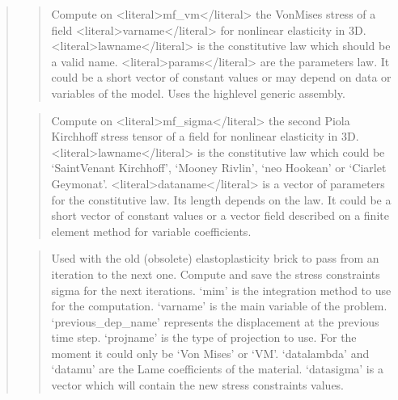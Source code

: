\documentclass[a4paper,11pt,english]{sphinxmanual}
\begin{document}
\begin{quote}
\sphinxAtStartPar
{}
\begin{quote}

\sphinxAtStartPar
Compute on \textless{}literal\textgreater{}mf\_vm\textless{}/literal\textgreater{} the Von\sphinxhyphen{}Mises stress of a field \textless{}literal\textgreater{}varname\textless{}/literal\textgreater{}
for nonlinear elasticity in 3D. \textless{}literal\textgreater{}lawname\textless{}/literal\textgreater{} is the constitutive law which
should be a valid name. \textless{}literal\textgreater{}params\textless{}/literal\textgreater{} are the parameters law. It could be
a short vector of constant values or may depend on data or variables
of the model.
Uses the high\sphinxhyphen{}level generic assembly.
\end{quote}

\sphinxAtStartPar
{}
\begin{quote}

\sphinxAtStartPar
Compute on \textless{}literal\textgreater{}mf\_sigma\textless{}/literal\textgreater{} the second Piola Kirchhoff stress tensor of a field
for nonlinear elasticity in 3D. \textless{}literal\textgreater{}lawname\textless{}/literal\textgreater{} is the constitutive law which
could be ‘SaintVenant Kirchhoff’, ‘Mooney Rivlin’, ‘neo Hookean’ or
‘Ciarlet Geymonat’.
\textless{}literal\textgreater{}dataname\textless{}/literal\textgreater{} is a vector of parameters for the constitutive law. Its length
depends on the law. It could be a short vector of constant values or a
vector field described on a finite element method for variable
coefficients.
\end{quote}

\sphinxAtStartPar
{}
\begin{quote}

\sphinxAtStartPar
Used with the old (obsolete) elastoplasticity brick to pass from an
iteration to the next one.
Compute and save the stress constraints sigma for the next iterations.
‘mim’ is the integration method to use for the computation.
‘varname’ is the main variable of the problem.
‘previous\_dep\_name’ represents the displacement at the previous time step.
‘projname’ is the type of projection to use. For the moment it could only be ‘Von Mises’ or ‘VM’.
‘datalambda’ and ‘datamu’ are the Lame coefficients of the material.
‘datasigma’ is a vector which will contain the new stress constraints values.
\end{quote}


\end{quote}
\end{document}
